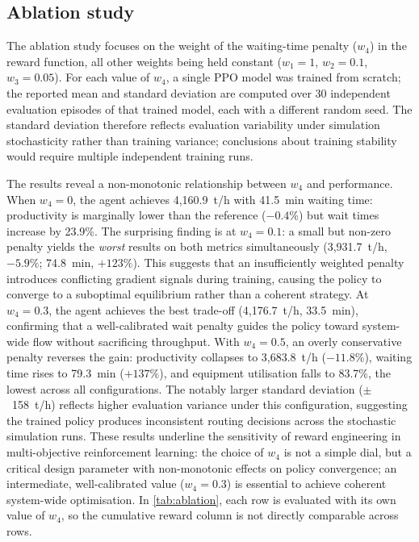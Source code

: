 \documentclass[11pt,a4paper]{article}
\begin{document}
\subsection{Ablation study}
\label{sec:ablation}

The ablation study focuses on the weight of the waiting-time penalty ($w_4$) in the reward function, all other weights being held constant ($w_1 = 1$, $w_2 = 0.1$, $w_3 = 0.05$). For each value of $w_4$, a single PPO model was trained from scratch; the reported mean and standard deviation are computed over 30 independent evaluation episodes of that trained model, each with a different random seed. The standard deviation therefore reflects evaluation variability under simulation stochasticity rather than training variance; conclusions about training stability would require multiple independent training runs.

The results reveal a non-monotonic relationship between $w_4$ and performance. When $w_4 = 0$, the agent achieves 4,160.9~t/h with 41.5~min waiting time: productivity is marginally lower than the reference ($-0.4\%$) but wait times increase by 23.9\%. The surprising finding is at $w_4 = 0.1$: a small but non-zero penalty yields the \emph{worst} results on both metrics simultaneously (3,931.7~t/h, $-5.9\%$; 74.8~min, $+123\%$). This suggests that an insufficiently weighted penalty introduces conflicting gradient signals during training, causing the policy to converge to a suboptimal equilibrium rather than a coherent strategy. At $w_4 = 0.3$, the agent achieves the best trade-off (4,176.7~t/h, 33.5~min), confirming that a well-calibrated wait penalty guides the policy toward system-wide flow without sacrificing throughput. With $w_4 = 0.5$, an overly conservative penalty reverses the gain: productivity collapses to 3,683.8~t/h ($-11.8\%$), waiting time rises to 79.3~min ($+137\%$), and equipment utilisation falls to 83.7\%, the lowest across all configurations. The notably larger standard deviation ($\pm$~158~t/h) reflects higher evaluation variance under this configuration, suggesting the trained policy produces inconsistent routing decisions across the stochastic simulation runs. These results underline the sensitivity of reward engineering in multi-objective reinforcement learning: the choice of $w_4$ is not a simple dial, but a critical design parameter with non-monotonic effects on policy convergence; an intermediate, well-calibrated value ($w_4 = 0.3$) is essential to achieve coherent system-wide optimisation. In \cref{tab:ablation}, each row is evaluated with its own value of $w_4$, so the cumulative reward column is not directly comparable across rows.
\end{document}
